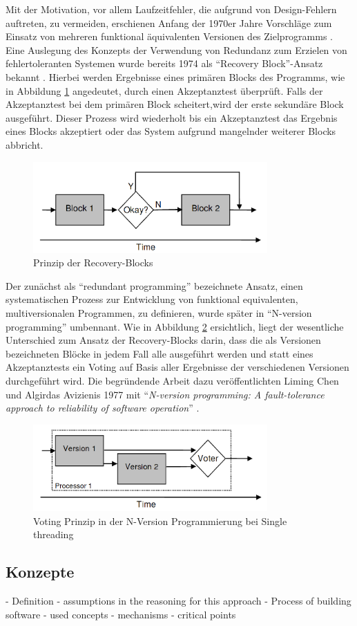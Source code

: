 Mit der Motivation, vor allem Laufzeitfehler, die aufgrund von Design-Fehlern auftreten, zu vermeiden, erschienen Anfang der 1970er Jahre Vorschläge zum Einsatz von mehreren funktional äquivalenten Versionen des Zielprogramms \cite{methodology}.
Eine Auslegung des Konzepts der Verwendung von Redundanz zum Erzielen von fehlertoleranten Systemen wurde bereits 1974 als \enquote{Recovery Block}-Ansatz bekannt \cite{Horning:1974:PSE:647641.733522}.
Hierbei werden Ergebnisse eines primären Blocks des Programms, wie in Abbildung \ref{graph-recovery} angedeutet, durch einen Akzeptanztest überprüft.
Falls der Akzeptanztest bei dem primären Block scheitert,wird der erste sekundäre Block ausgeführt. Dieser Prozess wird wiederholt bis ein Akzeptanztest das Ergebnis eines Blocks akzeptiert oder das System aufgrund mangelnder weiterer Blocks abbricht.
%
%
\begin{figure}[ht]
	\centering
	\includegraphics[width=0.8\textwidth,natwidth=901,natheight=333]{grafiken/recovery-block.png}
	\caption{Prinzip der Recovery-Blocks \cite{lardner}}
	\label{graph-recovery}
\end{figure}
%
%
Der zunächst als \enquote{redundant programming} bezeichnete Ansatz, einen systematischen Prozess zur Entwicklung von funktional equivalenten, multiversionalen Programmen, zu definieren, wurde später in \enquote{N-version programming} umbennant.
Wie in Abbildung \ref{graph-n-version-single} ersichtlich, liegt der wesentliche Unterschied zum Ansatz der Recovery-Blocks darin, dass die als Versionen bezeichneten Blöcke in jedem Fall alle ausgeführt werden und statt eines Akzeptanztests ein Voting auf Basis aller Ergebnisse der verschiedenen Versionen durchgeführt wird.
Die begründende Arbeit dazu veröffentlichten Liming Chen und Algirdas Avizienis 1977 mit \enquote{\emph{N-version programming: A fault-tolerance approach to reliability of software operation}} \cite{Chen1978}.
%
%
\begin{figure}[ht]
	\centering
	\includegraphics[width=0.8\textwidth,natwidth=901,natheight=333]{grafiken/single-thread-n-version.png}
	\caption{Voting Prinzip in der N-Version Programmierung bei Single threading \cite{lardner}}
	\label{graph-n-version-single}
\end{figure}
%
%

\subsection{Konzepte} \label{konzepte}

- Definition
- assumptions in the reasoning for this approach
- Process of building software
- used concepts
- mechanisms
- critical points

